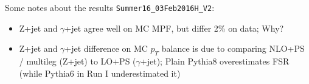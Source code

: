 \documentclass[landscape,10pt]{beamer} %
\begin{document}
Some notes about the results \verb|Summer16_03Feb2016H_V2|:
\begin{itemize}
\item Z+jet and $\gamma$+jet agree well on MC MPF, but differ 2\% on data; Why?
\item Z+jet  and $\gamma$+jet difference on MC $p_T$ balance is due to comparing NLO+PS / multileg (Z+jet) to LO+PS ($\gamma$+jet); Plain Pythia8 overestimates FSR (while Pythia6 in Run I underestimated it)
\end{itemize}
\end{document}
